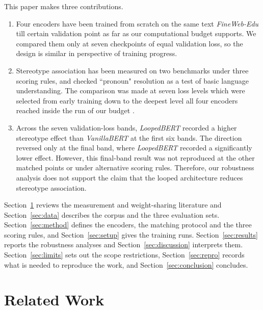 \documentclass[sigconf,natbib=true,anonymous=true]{acmart}
\begin{document}
This paper makes three contributions.

\begin{enumerate}
\item Four encoders have been trained from scratch on the same text \emph{FineWeb-Edu} \citep{penedo2024fineweb} till certain validation point as far as our computational budget supports. We compared them only at seven checkpoints of equal
      validation loss, so the design is similar in perspective of training progress.
\item Stereotype association has been measured on two benchmarks under three scoring
      rules, and checked ``pronoun" resolution as a test of basic language
      understanding. The comparison was made at seven loss levels which were selected
      from early training down to the deepest level all four encoders reached inside the run of our budget .

\item Across the seven validation-loss bands, \emph{LoopedBERT} recorded a
      higher stereotype effect than \emph{VanillaBERT} at the first six
      bands. The direction reversed only at the final band, where
      \emph{LoopedBERT} recorded a significantly lower effect. However, this
      final-band result was not reproduced at the other matched points or
      under alternative scoring rules. Therefore, our robustness analysis
      does not support the claim that the looped architecture reduces
      stereotype association.

\end{enumerate}


Section~\ref{sec:related} reviews the measurement and weight-sharing literature and Section~\ref{sec:data} describes the corpus and the three evaluation sets. Section~\ref{sec:method} defines the encoders, the matching protocol and the three scoring rules, and Section~\ref{sec:setup} gives the training runs. Section~\ref{sec:results} reports the robustness analyses and Section~\ref{sec:discussion} interprets them. Section~\ref{sec:limits} sets out the scope restrictions, Section~\ref{sec:repro} records what is needed to reproduce the work, and Section~\ref{sec:conclusion} concludes.

\section{Related Work}
\label{sec:related}
\end{document}
